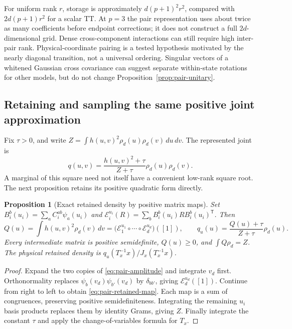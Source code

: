 \documentclass[11pt]{article}
\newtheorem{proposition}{Proposition}
\begin{document}
For uniform rank $r$, storage is approximately $d(p+1)^2r^2$, compared with
$2d(p+1)r^2$ for a scalar TT. At $p=3$ the pair representation uses about
twice as many coefficients before endpoint corrections; it does not construct
a full $2d$-dimensional grid. Dense cross-component interactions can still
require high inter-pair rank. Physical-coordinate pairing is a tested
hypothesis motivated by the nearly diagonal transition, not a universal
ordering. Singular vectors of a whitened Gaussian cross covariance can suggest
separate within-state rotations for other models, but do not change
Proposition~\ref{prop:pair-unitary}.

\subsection{Retaining and sampling the same positive joint approximation}

Fix $\tau>0$, and write
$Z=\int h(u,v)^2\rho_d(u)\rho_d(v)\,du\,dv$. The represented joint is
\begin{equation}
 q(u,v)=\frac{h(u,v)^2+\tau}{Z+\tau}\rho_d(u)\rho_d(v).
 \label{eq:pair-joint}
\end{equation}
A marginal of this square need not itself have a convenient low-rank square
root. The next proposition retains its positive quadratic form directly.

\begin{proposition}[Exact retained density by positive matrix maps]
\label{prop:pair-marginal}
Set $B_i^b(u_i)=\sum_a C_i^{ab}\psi_a(u_i)$ and
$\mathcal E_i^{u_i}(R)=\sum_bB_i^b(u_i)R B_i^b(u_i)^{\mathsf T}$. Then
\begin{equation}
 Q(u)=\int h(u,v)^2\rho_d(v)\,dv
 =\bigl(\mathcal E_1^{u_1}\circ\cdots\circ\mathcal E_d^{u_d}\bigr)([1]),
 \qquad q_u(u)=\frac{Q(u)+\tau}{Z+\tau}\rho_d(u).
 \label{eq:pair-retained-map}
\end{equation}
Every intermediate matrix is positive semidefinite, $Q(u)\geq0$, and
$\int Q\rho_d=Z$. The physical retained density is
$q_u(T_x^{-1}x)/J_x(T_x^{-1}x)$.
\end{proposition}
\begin{proof}
Expand the two copies of \eqref{eq:pair-amplitude} and integrate $v_d$ first.
Orthonormality replaces $\psi_b(v_d)\psi_{b'}(v_d)$ by $\delta_{bb'}$, giving
$\mathcal E_d^{u_d}([1])$. Continue from right to left to obtain
\eqref{eq:pair-retained-map}. Each map is a sum of congruences, preserving
positive semidefiniteness. Integrating the remaining $u_i$ basis products
replaces them by identity Grams, giving $Z$. Finally integrate the constant
$\tau$ and apply the change-of-variables formula for $T_x$.
\end{proof}
\end{document}
